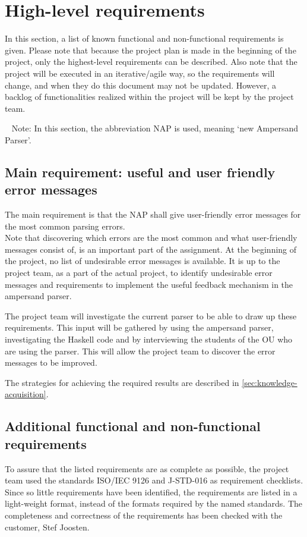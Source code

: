 \section{High-level requirements}
\label{sec:requirements}
In this section, a list of known functional and non-functional requirements is given.
Please note that because the project plan is made in the beginning of the project, only the highest-level requirements can be described.
Also note that the project will be executed in an iterative/agile way, so the requirements will change, and when they do this document may not be updated.
However, a backlog of functionalities realized within the project will be kept by the project team.

~\newline\noindent
Note: In this section, the abbreviation NAP is used, meaning `new Ampersand Parser'.
%

\subsection{Main requirement: useful and user friendly error messages}
The main requirement is that the NAP shall give user-friendly error messages for the most common parsing errors.\\
Note that discovering which errors are the most common and what user-friendly messages consist of, is an important part of the assignment.
At the beginning of the project, no list of undesirable error messages is available.
It is up to the project team, as a part of the actual project, to identify undesirable error messages and requirements to implement the useful feedback mechanism in the ampersand parser.

The project team will investigate the current parser to be able to draw up these requirements.
This input will be gathered by using the ampersand parser, investigating the Haskell code and by interviewing the students of the OU who are using the parser.
This will allow the project team to discover the error messages to be improved.

The strategies for achieving the required results are described in \autoref{sec:knowledge-acquisition}.

\subsection{Additional functional and non-functional requirements}
To assure that the listed requirements are as complete as possible, the project team used the standards ISO/IEC 9126 \cite{iso-9126} and J-STD-016 \cite{jstd-016} as requirement checklists.
Since so little requirements have been identified, the requirements are listed in a light-weight format, instead of the formats required by the named standards.
The completeness and correctness of the requirements has been checked with the customer, Stef Joosten.

